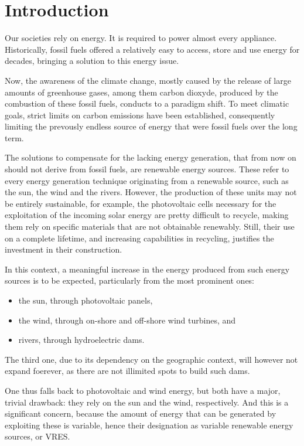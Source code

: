 \section{Introduction}

Our societies rely on energy. It is required to power almost every appliance. Historically, fossil fuels offered a relatively easy to access, store and use energy for decades, bringing a solution to this energy issue.

Now, the awareness of the climate change, mostly caused by the release of large amounts of greenhouse gases, among them carbon dioxyde, produced by the combustion of these fossil fuels, conducts to a paradigm shift. To meet climatic goals, strict limits on carbon emissions have been established, consequently limiting the prevously endless source of energy that were fossil fuels over the long term.

The solutions to compensate for the lacking energy generation, that from now on should not derive from fossil fuels, are renewable energy sources. These refer to every energy generation technique originating from a renewable source, such as the sun, the wind and the rivers. However, the production of these units may not be entirely sustainable, for example, the photovoltaic cells necessary for the exploitation of the incoming solar energy are pretty difficult to recycle, making them rely on specific materials that are not obtainable renewably. Still, their use on a complete lifetime, and increasing capabilities in recycling, justifies the investment in their construction.

In this context, a meaningful increase in the energy produced from such energy sources is to be expected, particularly from the most prominent ones:
\begin{itemize}
    \item the sun, through photovoltaic panels,
    \item the wind, through on-shore and off-shore wind turbines, and
    \item rivers, through hydroelectric dams.
\end{itemize}

The third one, due to its dependency on the geographic context, will however not expand foerever, as there are not illimited spots to build such dams.

One thus falls back to photovoltaic and wind energy, but both have a major, trivial drawback: they rely on the sun and the wind, respectively. And this is a significant concern, because the amount of energy that can be generated by exploiting these is variable, hence their designation as variable renewable energy sources, or VRES.

